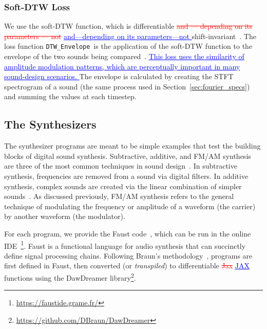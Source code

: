 \documentclass[lettersize,journal]{IEEEtran}
\makeatletter
\renewcommand{\DIFadd}[1]{\textcolor{blue}{\uline{#1}}}
\renewcommand{\DIFdel}[1]{\textcolor{red}{\sout{#1}}}
\newcommand{\DTWEnv}{\texttt{DTW\_Envelope}}
\providecommand{\DIFadd}[1]{{\protect\color{blue}\uwave{#1}}} %
\providecommand{\DIFdel}[1]{{\protect\color{red}\sout{#1}}} %
\providecommand{\DIFaddbegin}{} %
\providecommand{\DIFaddend}{} %
\providecommand{\DIFdelbegin}{} %
\providecommand{\DIFdelend}{} %
\providecommand{\DIFscaledelfig}{0.5}
\newlength{\DIFdelgraphicswidth} %
\newlength{\DIFdelgraphicsheight} %
\providecommand{\DIFaddincludegraphics}[2][]{{\color{blue}\fbox{\DIFOincludegraphics[#1]{#2}}}} %
\providecommand{\DIFdelincludegraphics}[2][]{%
\sbox{\DIFdelgraphicsbox}{\DIFOincludegraphics[#1]{#2}}%
\settoboxwidth{\DIFdelgraphicswidth}{\DIFdelgraphicsbox} %
\settoboxtotalheight{\DIFdelgraphicsheight}{\DIFdelgraphicsbox} %
\scalebox{\DIFscaledelfig}{%
\parbox[b]{\DIFdelgraphicswidth}{\usebox{\DIFdelgraphicsbox}\\[-\baselineskip] \rule{\DIFdelgraphicswidth}{0em}}\llap{\resizebox{\DIFdelgraphicswidth}{\DIFdelgraphicsheight}{%
\setlength{\unitlength}{\DIFdelgraphicswidth}%
\begin{picture}(1,1)%
\thicklines\linethickness{2pt} %
{\color[rgb]{1,0,0}\put(0,0){\framebox(1,1){}}}%
{\color[rgb]{1,0,0}\put(0,0){\line( 1,1){1}}}%
{\color[rgb]{1,0,0}\put(0,1){\line(1,-1){1}}}%
\end{picture}%
}\hspace*{3pt}}} %
} %
\DeclareRobustCommand{\DIFaddbegin}{\DIFOaddbegin \let\includegraphics\DIFaddincludegraphics} %
\DeclareRobustCommand{\DIFaddend}{\DIFOaddend \let\includegraphics\DIFOincludegraphics} %
\DeclareRobustCommand{\DIFdelbegin}{\DIFOdelbegin \let\includegraphics\DIFdelincludegraphics} %
\DeclareRobustCommand{\DIFdelend}{\DIFOaddend \let\includegraphics\DIFOincludegraphics} %
\let\sout@orig\sout %
\renewcommand{\sout}[1]{\ifmmode\text{\sout@orig{\ensuremath{#1}}}\else\sout@orig{#1}\fi} %
\makeatother
\begin{document}
\subsubsection{Soft-DTW Loss}
We use the soft-DTW function, which is differentiable \DIFdelbegin \DIFdel{and --- depending on its parameters --- not }\DIFdelend \DIFaddbegin \DIFadd{and---depending on its parameters---not }\DIFaddend shift-invariant~\cite{cuturi2017soft,janati2020spatio,tavenard.blog.softdtw}. The loss function \DTWEnv~is the application of the soft-DTW function to the envelope of the two sounds being compared~\cite{lyons1997understanding}. \DIFaddbegin \DIFadd{This loss uses the similarity of amplitude modulation patterns, which are perceptually important in many sound-design scenarios. }\DIFaddend The envelope is calculated by creating the STFT spectrogram of a sound (the same process used in Section~\ref{sec:fourier_specs}) and summing the values at each timestep. 

\subsection{The Synthesizers}
\label{sec:programs}
The synthesizer programs are meant to be simple examples that test the building blocks of digital sound synthesis. Subtractive, additive, and FM/AM synthesis are three of the most common techniques in sound design~\cite{smith1991viewpoints}. In subtractive synthesis, frequencies are removed from a sound via digital filters. In additive synthesis, complex sounds are created via the linear combination of simpler sounds~\cite{lyons1997understanding,smith2007introduction}. As discussed previously, FM/AM synthesis refers to the general technique of modulating the frequency or amplitude of a waveform (the carrier) by another waveform (the modulator).

For each program, we provide the Faust code~\cite{orlarey2009faust}, which can be run in the online IDE~\footnote{\url{https://faustide.grame.fr/}}. Faust is a functional language for audio synthesis that can succinctly define signal processing chains. Following Braun's methodology~\cite{braun2024dac}, programs are first defined in Faust, then converted (or \textit{transpiled}) to differentiable \DIFdelbegin \DIFdel{Jax }\DIFdelend \DIFaddbegin \DIFadd{JAX }\DIFaddend functions using the DawDreamer library\footnote{\url{https://github.com/DBraun/DawDreamer}}. 
\DIFdelbegin %
\end{document}
